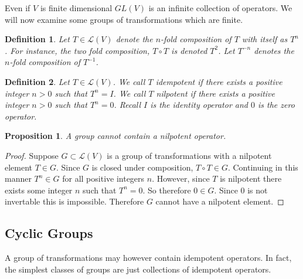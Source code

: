 \documentclass{article}
\theoremstyle{problemstyle}
\newtheorem{proposition}{Proposition}
\newtheorem{definition}{Definition}
\begin{document}
Even if $V$ is finite dimensional $GL(V)$ is an infinite collection of operators. We will now examine some groups of transformations which are finite. 


\begin{definition}
Let $T \in \mathscr{L}(V)$ denote the $n$-fold composition of $T$ with itself as $T^n$. For instance, the two fold composition, $T \circ T$ is denoted $T^2$.  Let $T^{-n}$ denotes the $n$-fold composition of $T^{-1}$. 
\end{definition}

\begin{definition}
Let $T \in \mathscr{L}(V)$. We call $T$ idempotent if there exists a positive integer $n>0$ such that $T^n = I$. We call $T$ nilpotent if there exists a positive integer $n>0$ such that $T^n = 0$.  Recall $I$ is the identity operator and $0$ is the zero operator. 
\end{definition}

\begin{proposition}
A group cannot contain a nilpotent operator. 
\end{proposition}

\begin{proof}
Suppose $G \subset \mathscr{L}(V)$ is a group of transformations with a nilpotent element $T \in G$. Since $G$ is closed under composition, $T \circ T \in G$. Continuing in this manner $T^n \in G$ for all positive integers $n$. However, since $T$ is nilpotent there exists some integer $n$ such that $T^n = 0$. So therefore $0 \in G$. Since $0$ is not invertable this is impossible. Therefore $G$ cannot have a nilpotent element. 
\end{proof}

\subsection*{Cyclic Groups}

A group of transformations may however contain idempotent operators. In fact, the simplest classes of groups are just collections of idempotent operators.  
\end{document}
